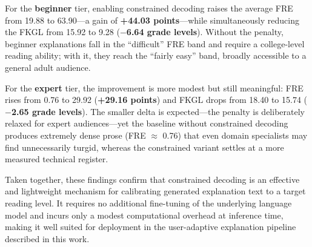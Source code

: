 For the \textbf{beginner} tier, enabling constrained decoding raises the average FRE from 19.88 to 63.90---a gain of \textbf{+44.03 points}---while simultaneously reducing the FKGL from 15.92 to 9.28 (\textbf{$-$6.64 grade levels}). Without the penalty, beginner explanations fall in the ``difficult'' FRE band and require a college-level reading ability; with it, they reach the ``fairly easy'' band, broadly accessible to a general adult audience.

For the \textbf{expert} tier, the improvement is more modest but still meaningful: FRE rises from 0.76 to 29.92 (\textbf{+29.16 points}) and FKGL drops from 18.40 to 15.74 (\textbf{$-$2.65 grade levels}). The smaller delta is expected---the penalty is deliberately relaxed for expert audiences---yet the baseline without constrained decoding produces extremely dense prose (FRE $\approx$ 0.76) that even domain specialists may find unnecessarily turgid, whereas the constrained variant settles at a more measured technical register.

Taken together, these findings confirm that constrained decoding is an effective and lightweight mechanism for calibrating generated explanation text to a target reading level. It requires no additional fine-tuning of the underlying language model and incurs only a modest computational overhead at inference time, making it well suited for deployment in the user-adaptive explanation pipeline described in this work.





